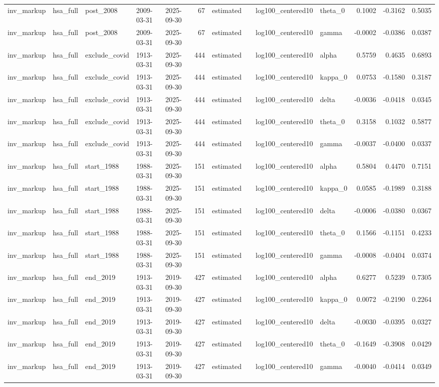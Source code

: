 \begin{tabular}{lllllrllllrrr}
inv\_markup & hsa\_full & post\_2008 & 2009-03-31 & 2025-09-30 & 67 & estimated &  & log100\_centered10 & theta\_0 & 0.1002 & -0.3162 & 0.5035 \\
inv\_markup & hsa\_full & post\_2008 & 2009-03-31 & 2025-09-30 & 67 & estimated &  & log100\_centered10 & gamma & -0.0002 & -0.0386 & 0.0387 \\
inv\_markup & hsa\_full & exclude\_covid & 1913-03-31 & 2025-09-30 & 444 & estimated &  & log100\_centered10 & alpha & 0.5759 & 0.4635 & 0.6893 \\
inv\_markup & hsa\_full & exclude\_covid & 1913-03-31 & 2025-09-30 & 444 & estimated &  & log100\_centered10 & kappa\_0 & 0.0753 & -0.1580 & 0.3187 \\
inv\_markup & hsa\_full & exclude\_covid & 1913-03-31 & 2025-09-30 & 444 & estimated &  & log100\_centered10 & delta & -0.0036 & -0.0418 & 0.0345 \\
inv\_markup & hsa\_full & exclude\_covid & 1913-03-31 & 2025-09-30 & 444 & estimated &  & log100\_centered10 & theta\_0 & 0.3158 & 0.1032 & 0.5877 \\
inv\_markup & hsa\_full & exclude\_covid & 1913-03-31 & 2025-09-30 & 444 & estimated &  & log100\_centered10 & gamma & -0.0037 & -0.0400 & 0.0337 \\
inv\_markup & hsa\_full & start\_1988 & 1988-03-31 & 2025-09-30 & 151 & estimated &  & log100\_centered10 & alpha & 0.5804 & 0.4470 & 0.7151 \\
inv\_markup & hsa\_full & start\_1988 & 1988-03-31 & 2025-09-30 & 151 & estimated &  & log100\_centered10 & kappa\_0 & 0.0585 & -0.1989 & 0.3188 \\
inv\_markup & hsa\_full & start\_1988 & 1988-03-31 & 2025-09-30 & 151 & estimated &  & log100\_centered10 & delta & -0.0006 & -0.0380 & 0.0367 \\
inv\_markup & hsa\_full & start\_1988 & 1988-03-31 & 2025-09-30 & 151 & estimated &  & log100\_centered10 & theta\_0 & 0.1566 & -0.1151 & 0.4233 \\
inv\_markup & hsa\_full & start\_1988 & 1988-03-31 & 2025-09-30 & 151 & estimated &  & log100\_centered10 & gamma & -0.0008 & -0.0404 & 0.0374 \\
inv\_markup & hsa\_full & end\_2019 & 1913-03-31 & 2019-09-30 & 427 & estimated &  & log100\_centered10 & alpha & 0.6277 & 0.5239 & 0.7305 \\
inv\_markup & hsa\_full & end\_2019 & 1913-03-31 & 2019-09-30 & 427 & estimated &  & log100\_centered10 & kappa\_0 & 0.0072 & -0.2190 & 0.2264 \\
inv\_markup & hsa\_full & end\_2019 & 1913-03-31 & 2019-09-30 & 427 & estimated &  & log100\_centered10 & delta & -0.0030 & -0.0395 & 0.0327 \\
inv\_markup & hsa\_full & end\_2019 & 1913-03-31 & 2019-09-30 & 427 & estimated &  & log100\_centered10 & theta\_0 & -0.1649 & -0.3908 & 0.0429 \\
inv\_markup & hsa\_full & end\_2019 & 1913-03-31 & 2019-09-30 & 427 & estimated &  & log100\_centered10 & gamma & -0.0040 & -0.0414 & 0.0349 \\
\bottomrule
\end{tabular}
